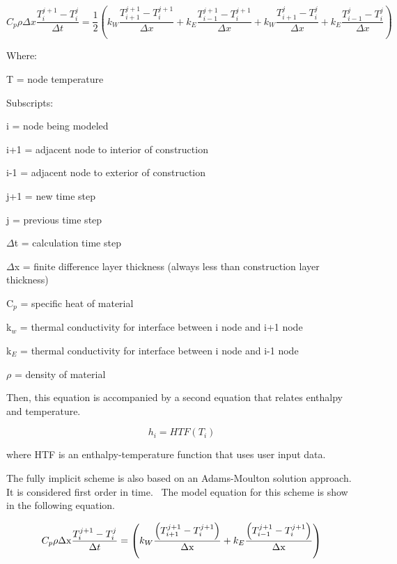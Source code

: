 \begin{equation}
C_p \rho \Delta x \frac{T_i^{j+1}-T_i^j}{\Delta t} = 
     \frac{1}{2}\left(k_W\frac{T_{i+1}^{j+1}-T_{i}^{j+1}}{\Delta x} +
                      k_E\frac{T_{i-1}^{j+1}-T_{i}^{j+1}}{\Delta x} + 
                      k_W\frac{T_{i+1}^{j}-T_{i}^{j}}{\Delta x} +
                      k_E\frac{T_{i-1}^{j}-T_{i}^{j}}{\Delta x}\right)
\end{equation}

Where:

T = node temperature

Subscripts:

i = node being modeled

i+1 = adjacent node to interior of construction

i-1 = adjacent node to exterior of construction

j+1 = new time step

j = previous time step

$\Delta$t = calculation time step

$\Delta$x = finite difference layer thickness (always less than construction layer thickness)

C\(_{p}\) = specific heat of material

k\(_{w}\) = thermal conductivity for interface between i node and i+1 node

k\(_{E}\) = thermal conductivity for interface between i node and i-1 node

$\rho$ = density of material

Then, this equation is accompanied by a second equation that relates enthalpy and temperature.

\begin{equation}
{h_i} = HTF\left( {{T_i}} \right)
\end{equation}

where HTF is an enthalpy-temperature function that uses user input data.

The fully implicit scheme is also based on an Adams-Moulton solution approach. It is considered first order in time.~ The model equation for this scheme is show in the following equation.

\begin{equation}
{C_p}\rho {\rm{\Delta x}}\frac{{T_i^{j + 1} - T_i^j}}{{{\rm{\Delta }}t}} = \left( {{k_W}\frac{{\left( {T_{i + 1}^{j + 1} - T_i^{j + 1}} \right)}}{{{\rm{\Delta x}}}} + {k_E}\frac{{\left( {T_{i - 1}^{j + 1} - T_i^{j + 1}} \right)}}{{{\rm{\Delta x}}}}} \right)
\end{equation}

